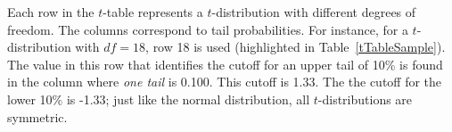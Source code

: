 Each row in the $t$-table represents a $t$-distribution with different degrees of freedom. The columns correspond to tail probabilities. For instance, for a  $t$-distribution with $df=18$, row 18 is used (highlighted in Table~\ref{tTableSample}). The value in this row that identifies the cutoff for an upper tail of 10\% is found in the column where \emph{one tail} is 0.100. This cutoff is 1.33. The the cutoff for the lower 10\% is  -1.33; just like the normal distribution, all $t$-distributions are symmetric.






